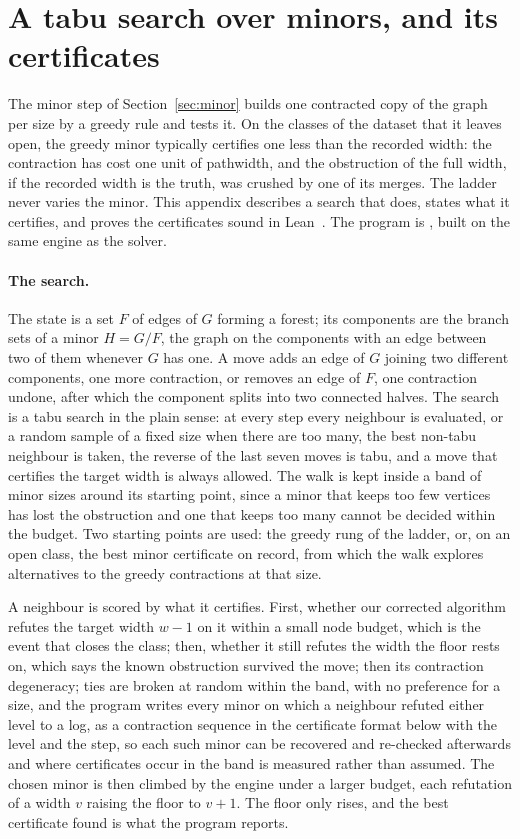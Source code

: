 \section{A tabu search over minors, and its certificates}
\label{app:tabu}

The minor step of Section~\ref{sec:minor} builds one contracted copy of the
graph per size by a greedy rule and tests it. On the classes of the dataset
that it leaves open, the greedy minor typically certifies one less than the
recorded width: the contraction has cost one unit of pathwidth, and the
obstruction of the full width, if the recorded width is the truth, was crushed
by one of its merges. The ladder never varies the minor. This appendix
describes a search that does, states what it certifies, and proves the
certificates sound in Lean~. The program is
, built on the same engine as the
solver.

\paragraph{The search.} The state is a set $F$ of edges of $G$ forming a
forest; its components are the branch sets of a minor $H=G/F$, the graph on
the components with an edge between two of them whenever $G$ has one. A move
adds an edge of $G$ joining two different components, one more contraction,
or removes an edge of $F$, one contraction undone, after which the component
splits into two connected halves. The search is a tabu search in the plain
sense: at every step every neighbour is evaluated, or a random sample of a
fixed size when there are too many, the best non-tabu neighbour is taken, the
reverse of the last seven moves is tabu, and a move that certifies the target
width is always allowed. The walk is kept inside a band of minor sizes around
its starting point, since a minor that keeps too few vertices has lost the
obstruction and one that keeps too many cannot be decided within the budget.
Two starting points are used: the greedy rung of the ladder, or, on an open
class, the best minor certificate on record, from which the walk explores
alternatives to the greedy contractions at that size.

A neighbour is scored by what it certifies. First, whether our corrected
algorithm refutes the target width $w-1$ on it within a small node budget,
which is the event that closes the class; then, whether it still refutes the
width the floor rests on, which says the known obstruction survived the move;
then its contraction degeneracy; ties are broken at random within the band,
with no preference for a size, and the program writes every minor on which a
neighbour refuted either level to a log, as a contraction sequence in the
certificate format below with the level and the step, so each such minor can
be recovered and re-checked afterwards and where certificates occur in the
band is measured rather than assumed. The chosen minor is then climbed
by the engine under a larger budget, each refutation of a width $v$ raising
the floor to $v+1$. The floor only rises, and the best certificate found is
what the program reports.

